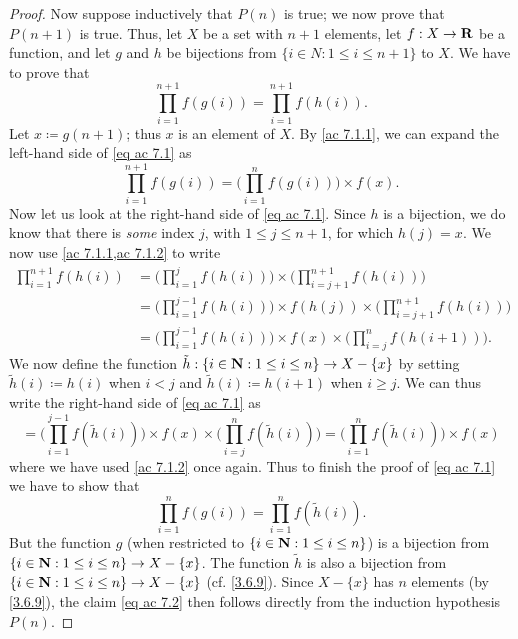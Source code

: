 \begin{proof}
  Now suppose inductively that \(P(n)\) is true;
  we now prove that \(P(n + 1)\) is true.
  Thus, let \(X\) be a set with \(n + 1\) elements, let \(f : X \to \mathbf{R}\) be a function, and let \(g\) and \(h\) be bijections from \(\{i \in N : 1 \leq i \leq n + 1\}\) to \(X\).
  We have to prove that
  \[
    \prod_{i = 1}^{n + 1} f(g(i)) = \prod_{i = 1}^{n + 1} f(h(i)). \tag{ac 7.1}\label{eq ac 7.1}
  \]
  Let \(x \coloneqq g(n + 1)\);
  thus \(x\) is an element of \(X\).
  By \cref{ac 7.1.1}, we can expand the left-hand side of \eqref{eq ac 7.1} as
  \[
    \prod_{i = 1}^{n + 1} f(g(i)) = \Bigg(\prod_{i = 1}^n f(g(i))\Bigg) \times f(x).
  \]
  Now let us look at the right-hand side of \eqref{eq ac 7.1}.
  Since \(h\) is a bijection, we do know that there is \emph{some} index \(j\), with \(1 \leq j \leq n + 1\), for which \(h(j) = x\).
  We now use \cref{ac 7.1.1,ac 7.1.2} to write
  \begin{align*}
    \prod_{i = 1}^{n + 1} f(h(i)) & = \Bigg(\prod_{i = 1}^j f(h(i))\Bigg) \times \Bigg(\prod_{i = j + 1}^{n + 1} f(h(i))\Bigg)                      \\
                                  & = \Bigg(\prod_{i = 1}^{j - 1} f(h(i))\Bigg) \times f(h(j)) \times \Bigg(\prod_{i = j + 1}^{n + 1} f(h(i))\Bigg) \\
                                  & = \Bigg(\prod_{i = 1}^{j - 1} f(h(i))\Bigg) \times f(x) \times \Bigg(\prod_{i = j}^n f(h(i + 1))\Bigg).
  \end{align*}
  We now define the function \(\tilde{h} : \{i \in \mathbf{N} : 1 \leq i \leq n\} \to X - \{x\}\) by setting \(\tilde{h}(i) \coloneqq h(i)\) when \(i < j\) and \(\tilde{h}(i) \coloneqq h(i + 1)\) when \(i \geq j\).
  We can thus write the right-hand side of \eqref{eq ac 7.1} as
  \[
    = \Bigg(\prod_{i = 1}^{j - 1} f(\tilde{h}(i))\Bigg) \times f(x) \times \Bigg(\prod_{i = j}^n f(\tilde{h}(i))\Bigg) = \Bigg(\prod_{i = 1}^n f(\tilde{h}(i))\Bigg) \times f(x)
  \]
  where we have used \cref{ac 7.1.2} once again.
  Thus to finish the proof of \eqref{eq ac 7.1} we have to show that
  \[
    \prod_{i = 1}^n f(g(i)) = \prod_{i = 1}^n f(\tilde{h}(i)). \tag{ac 7.2}\label{eq ac 7.2}
  \]
  But the function \(g\) (when restricted to \(\{i \in \mathbf{N} : 1 \leq i \leq n\}\)) is a bijection from \(\{i \in \mathbf{N} : 1 \leq i \leq n\} \to X - \{x\}\).
  The function \(\tilde{h}\) is also a bijection from \(\{i \in \mathbf{N} : 1 \leq i \leq n\} \to X - \{x\}\) (cf. \cref{3.6.9}).
  Since \(X - \{x\}\) has \(n\) elements (by \cref{3.6.9}), the claim \eqref{eq ac 7.2} then follows directly from the induction hypothesis \(P(n)\).
\end{proof}

